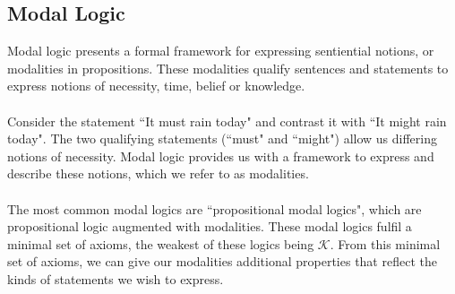 \documentclass[12pt, a4paper, twoside]{article}
\begin{document}
\subsection{Modal Logic}\label{epistemic_modal}
Modal logic presents a formal framework for expressing sentiential notions, or
modalities in propositions.
These modalities qualify sentences and statements to express notions of
necessity, time, belief or knowledge.\citep{blackburn2002modal}\\
\\
Consider the statement ``It must rain today" and contrast it with ``It
might rain today".
The two qualifying statements (``must" and ``might") allow us differing notions
of necessity.
Modal logic provides us with a framework to express and describe these
notions, which we refer to as modalities.\\
\\
The most common modal logics are ``propositional modal logics", which are
propositional logic augmented with modalities.
These modal logics fulfil a minimal set of axioms, the weakest of these logics
being $\mathcal{K}$.
From this minimal set of axioms, we can give our modalities additional
properties that reflect the kinds of statements we wish to express.
\end{document}
